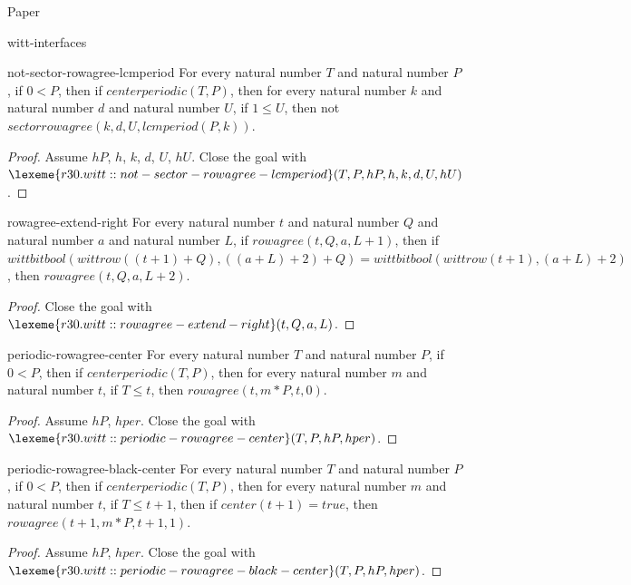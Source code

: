 \begin{lexlean}{Paper}
\begin{section}{witt-interfaces}
  \begin{theorem}{not-sector-rowagree-lcmperiod}
  For every natural number \(T\) and natural number \(P\), if \(0 < P\), then if \(centerperiodic(T, P)\), then for every natural number \(k\) and natural number \(d\) and natural number \(U\), if \(1 ≤ U\), then not \(sectorrowagree(k, d, U, lcmperiod(P, k))\).
  \begin{proof}
  Assume \(hP\), \(h\), \(k\), \(d\), \(U\), \(hU\).
  Close the goal with \(\lexeme{r30.witt::not-sector-rowagree-lcmperiod}(T, P, hP, h, k, d, U, hU)\).
  \end{proof}
  \end{theorem}

  \begin{theorem}{rowagree-extend-right}
  For every natural number \(t\) and natural number \(Q\) and natural number \(a\) and natural number \(L\), if \(rowagree(t, Q, a, L + 1)\), then if \(wittbitbool(wittrow((t + 1) + Q), ((a + L) + 2) + Q) = wittbitbool(wittrow(t + 1), (a + L) + 2)\), then \(rowagree(t, Q, a, L + 2)\).
  \begin{proof}
  Close the goal with \(\lexeme{r30.witt::rowagree-extend-right}(t, Q, a, L)\).
  \end{proof}
  \end{theorem}

  \begin{theorem}{periodic-rowagree-center}
  For every natural number \(T\) and natural number \(P\), if \(0 < P\), then if \(centerperiodic(T, P)\), then for every natural number \(m\) and natural number \(t\), if \(T ≤ t\), then \(rowagree(t, m * P, t, 0)\).
  \begin{proof}
  Assume \(hP\), \(hper\).
  Close the goal with \(\lexeme{r30.witt::periodic-rowagree-center}(T, P, hP, hper)\).
  \end{proof}
  \end{theorem}

  \begin{theorem}{periodic-rowagree-black-center}
  For every natural number \(T\) and natural number \(P\), if \(0 < P\), then if \(centerperiodic(T, P)\), then for every natural number \(m\) and natural number \(t\), if \(T ≤ t + 1\), then if \(center(t + 1) = true\), then \(rowagree(t + 1, m * P, t + 1, 1)\).
  \begin{proof}
  Assume \(hP\), \(hper\).
  Close the goal with \(\lexeme{r30.witt::periodic-rowagree-black-center}(T, P, hP, hper)\).
  \end{proof}
  \end{theorem}


\end{section}
\end{lexlean}
